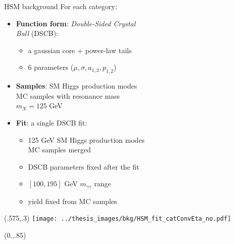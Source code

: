 \documentclass[10pt,UKenglish, leqno, xcolor = dvipsnames]{beamer}
\begin{document}
	\begin{frame}{HSM background}
		\vfill
		For each category:
		\begin{itemize}
			\item \textbf{Function form}: \textit{Double-Sided Crystal\\ Ball} (DSCB):
			\begin{itemize}
				\item a gaussian core + power-law tails
				\item 6 parameters ($\mu, \sigma, a_{1,2}, p_{1,2}$)
			\end{itemize}
			\item \textbf{Samples}: SM Higgs production modes\\ MC samples with resonance mass\\ $m_X=125$ GeV
			\item \textbf{Fit}: a single DSCB fit:
			\begin{itemize}
				\item 125 GeV SM Higgs production modes\\ MC samples merged
				\item DSCB parameters fixed after the fit
				\item $[100,195]$ GeV $m_{\gamma\gamma}$ range
				\item yield fixed from MC samples
			\end{itemize}
		\end{itemize}
		\vspace{.75cm}
		\vfill
		\begin{textblock}{1}(.575,.3)
			\texttt{[image: ../thesis\_images/bkg/HSM\_fit\_catConvEta\_no.pdf]}\\	
		\end{textblock}
		\begin{textblock}{1}(0.,.85)
			\begin{figure}
			\end{figure}
		\end{textblock}
	\end{frame}
\end{document}
